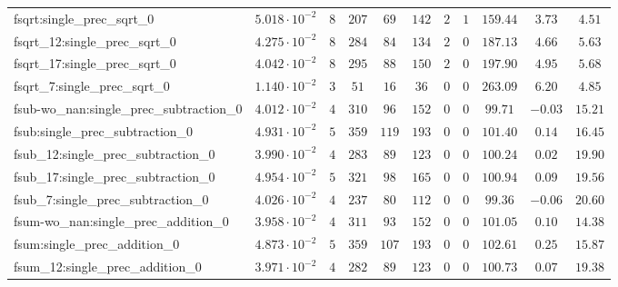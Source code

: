 \begin{tabular}{|l|c|c|c|c|c|c|c|c|c|c|}
fsqrt:single\_prec\_sqrt\_0                    & $ 5.018 \cdot 10^{-2} $ & $ 8      $ & $ 207    $ & $ 69    $ & $ 142   $ & $ 2   $ & $ 1 $ & $ 159.44      $ & $ 3.73    $ & $ 4.51    $ \\
fsqrt\_12:single\_prec\_sqrt\_0                & $ 4.275 \cdot 10^{-2} $ & $ 8      $ & $ 284    $ & $ 84    $ & $ 134   $ & $ 2   $ & $ 0 $ & $ 187.13      $ & $ 4.66    $ & $ 5.63    $ \\
fsqrt\_17:single\_prec\_sqrt\_0                & $ 4.042 \cdot 10^{-2} $ & $ 8      $ & $ 295    $ & $ 88    $ & $ 150   $ & $ 2   $ & $ 0 $ & $ 197.90      $ & $ 4.95    $ & $ 5.68    $ \\
fsqrt\_7:single\_prec\_sqrt\_0                 & $ 1.140 \cdot 10^{-2} $ & $ 3      $ & $ 51     $ & $ 16    $ & $ 36    $ & $ 0   $ & $ 0 $ & $ 263.09      $ & $ 6.20    $ & $ 4.85    $ \\
fsub-wo\_nan:single\_prec\_subtraction\_0      & $ 4.012 \cdot 10^{-2} $ & $ 4      $ & $ 310    $ & $ 96    $ & $ 152   $ & $ 0   $ & $ 0 $ & $ 99.71       $ & $ -0.03   $ & $ 15.21   $ \\
fsub:single\_prec\_subtraction\_0              & $ 4.931 \cdot 10^{-2} $ & $ 5      $ & $ 359    $ & $ 119   $ & $ 193   $ & $ 0   $ & $ 0 $ & $ 101.40      $ & $ 0.14    $ & $ 16.45   $ \\
fsub\_12:single\_prec\_subtraction\_0          & $ 3.990 \cdot 10^{-2} $ & $ 4      $ & $ 283    $ & $ 89    $ & $ 123   $ & $ 0   $ & $ 0 $ & $ 100.24      $ & $ 0.02    $ & $ 19.90   $ \\
fsub\_17:single\_prec\_subtraction\_0          & $ 4.954 \cdot 10^{-2} $ & $ 5      $ & $ 321    $ & $ 98    $ & $ 165   $ & $ 0   $ & $ 0 $ & $ 100.94      $ & $ 0.09    $ & $ 19.56   $ \\
fsub\_7:single\_prec\_subtraction\_0           & $ 4.026 \cdot 10^{-2} $ & $ 4      $ & $ 237    $ & $ 80    $ & $ 112   $ & $ 0   $ & $ 0 $ & $ 99.36       $ & $ -0.06   $ & $ 20.60   $ \\
fsum-wo\_nan:single\_prec\_addition\_0         & $ 3.958 \cdot 10^{-2} $ & $ 4      $ & $ 311    $ & $ 93    $ & $ 152   $ & $ 0   $ & $ 0 $ & $ 101.05      $ & $ 0.10    $ & $ 14.38   $ \\
fsum:single\_prec\_addition\_0                 & $ 4.873 \cdot 10^{-2} $ & $ 5      $ & $ 359    $ & $ 107   $ & $ 193   $ & $ 0   $ & $ 0 $ & $ 102.61      $ & $ 0.25    $ & $ 15.87   $ \\
fsum\_12:single\_prec\_addition\_0             & $ 3.971 \cdot 10^{-2} $ & $ 4      $ & $ 282    $ & $ 89    $ & $ 123   $ & $ 0   $ & $ 0 $ & $ 100.73      $ & $ 0.07    $ & $ 19.38   $ \\

\end{tabular}
